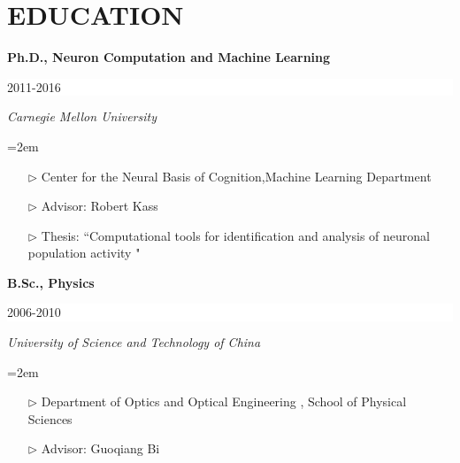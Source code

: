 \documentclass[paper=letter,fontsize=11pt]{scrartcl} %
\newcommand{\sepspace}{\vspace*{1em}}		%
\newcommand{\NewPart}[2]{\section*{\uppercase{#1} #2}}
\newcommand{\EducationEntry}[4]{
		\noindent \textbf{#1} \hfill      %
		\colorbox{White}{%
			\parbox{6em}{%
			\hfill\color{Black}#2}} \par  %
		\noindent \textit{#3} \par        %
		\noindent\hangindent=2em\hangafter=0 \small #4 %
		\normalsize \par}
\begin{document}
\NewPart{Education}{}

\EducationEntry{Ph.D., Neuron Computation and Machine Learning}{2011-2016}{Carnegie Mellon University}
{\begin{itemize}
\item[$\triangleright$]{Center for the Neural Basis of Cognition,Machine Learning Department}
\item[$\triangleright$]{Advisor: Robert Kass}
\item[$\triangleright$] Thesis: ``Computational tools for identification and analysis of neuronal population activity "
\end{itemize}}
\sepspace

\EducationEntry{B.Sc., Physics}{2006-2010}{University of Science and Technology of China}
{\begin{itemize}
\item[$\triangleright$] {Department of Optics and Optical Engineering
, School of Physical Sciences}
\item[$\triangleright$] {Advisor: Guoqiang Bi}
\end{itemize}}

\end{document}

